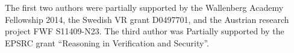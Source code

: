 The first two authors were partially supported by the Wallenberg Academy Fellowship 2014, the Swedish VR grant D0497701, and the Austrian research project FWF S11409-N23. The third author was Partially supported by the EPSRC grant ``Reasoning in Verification and Security''.